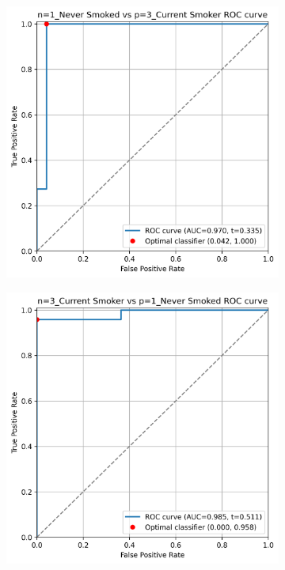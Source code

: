 \documentclass{article} %
\begin{document}
\begin{figure}[p]
    \centering
    \begin{subfigure}{0.46\linewidth}
        \centering
        \includegraphics[width=\linewidth]{cohort1/test_1v3_roc.png}
    \end{subfigure}
    \hspace{4mm}
    \begin{subfigure}{0.46\linewidth}
        \centering
        \includegraphics[width=\linewidth]{cohort1/test_3v1_roc.png}
    \end{subfigure}


\end{figure}
\end{document}
